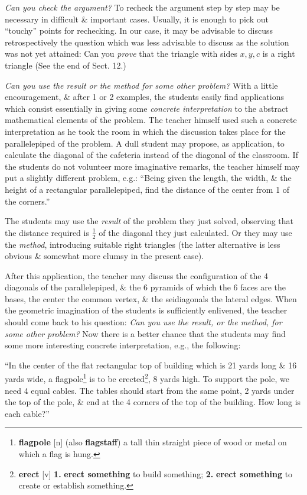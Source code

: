 \documentclass[oneside]{book}
\numberwithin{equation}{section}
\begin{document}
\textit{Can you check the argument?} To recheck the argument step by step may be necessary in difficult \& important cases. Usually, it is enough to pick out ``touchy'' points for rechecking. In our case, it may be advisable to discuss retrospectively the question which was less advisable to discuss as the solution was not yet attained: Can you \textit{prove} that the triangle with sides $x,y,c$ is a right triangle (See the end of Sect. 12.)

\textit{Can you use the result or the method for some other problem?} With a little encouragement, \& after 1 or 2 examples, the students easily find applications which consist essentially in giving some \textit{concrete interpretation} to the abstract mathematical elements of the problem. The teacher himself used such a concrete interpretation as he took the room in which the discussion takes place for the parallelepiped of the problem. A dull student may propose, as application, to calculate the diagonal of the cafeteria instead of the diagonal of the classroom. If the students do not volunteer more imaginative remarks, the teacher himself may put a slightly different problem, e.g.: ``Being given the length, the width, \& the height of a rectangular parallelepiped, find the distance of the center from 1 of the corners.''

The students may use the \textit{result} of the problem they just solved, observing that the distance required is $\frac{1}{2}$ of the diagonal they just calculated. Or they may use the \textit{method}, introducing suitable right triangles (the latter alternative is less obvious \& somewhat more clumsy in the present case).

After this application, the teacher may discuss the configuration of the 4 diagonals of the parallelepiped, \& the 6 pyramids of which the 6 faces are the bases, the center the common vertex, \& the seidiagonals the lateral edges. When the geometric imagination of the students is sufficiently enlivened, the teacher should come back to his question: \textit{Can you use the result, or the method, for some other problem?} Now there is a better chance that the students may find some more interesting concrete interpretation, e.g., the following:

``In the center of the flat rectangular top of building which is 21 yards long \& 16 yards wide, a flagpole\footnote{\textbf{flagpole} [n] (also \textbf{flagstaff}) a tall thin straight piece of wood or metal on which a flag is hung.} is to be erected\footnote{\textbf{erect} [v] \textbf{1.} \textbf{erect something} to build something; \textbf{2.} \textbf{erect something} to create or establish something.}, 8 yards high. To support the pole, we need 4 equal cables. The tables should start from the same point, 2 yards under the top of the pole, \& end at the 4 corners of the top of the building. How long is each cable?''
\end{document}
